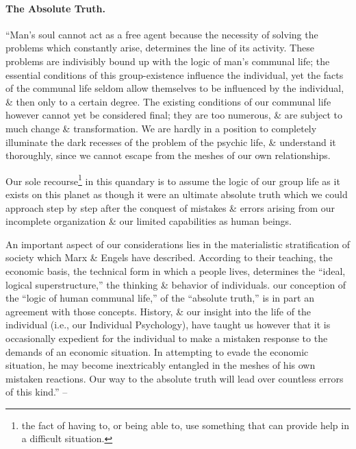 \documentclass{article}
\begin{document}
\paragraph{The Absolute Truth.} ``Man's soul cannot act as a free agent because the necessity of solving the problems which constantly arise, determines the line of its activity. These problems are indivisibly bound up with the logic of man's communal life; the essential conditions of this group-existence influence the individual, yet the facts of the communal life seldom allow themselves to be influenced by the individual, \& then only to a certain degree. The existing conditions of our communal life however cannot yet be considered final; they are too numerous, \& are subject to much change \& transformation. We are hardly in a position to completely illuminate the dark recesses of the problem of the psychic life, \& understand it thoroughly, since we cannot escape from the meshes of our own relationships.

Our sole recourse\footnote{the fact of having to, or being able to, use something that can provide help in a difficult situation.} in this quandary is to assume the logic of our group life as it exists on this planet as though it were an ultimate absolute truth which we could approach step by step after the conquest of mistakes \& errors arising from our incomplete organization \& our limited capabilities as human beings.

An important aspect of our considerations lies in the materialistic stratification of society which {\sc Marx} \& {\sc Engels} have described. According to their teaching, the economic basis, the technical form in which a people lives, determines the ``ideal, logical superstructure,'' the thinking \& behavior of individuals. our conception of the ``logic of human communal life,'' of the ``absolute truth,'' is in part an agreement with those concepts. History, \& our insight into the life of the individual (i.e., our Individual Psychology), have taught us however that it is occasionally expedient for the individual to make a mistaken response to the demands of an economic situation. In attempting to evade the economic situation, he may become inextricably entangled in the meshes of his own mistaken reactions. Our way to the absolute truth will lead over countless errors of this kind.'' -- \cite[pp. 26--27]{Adler_human_nature}
\end{document}
